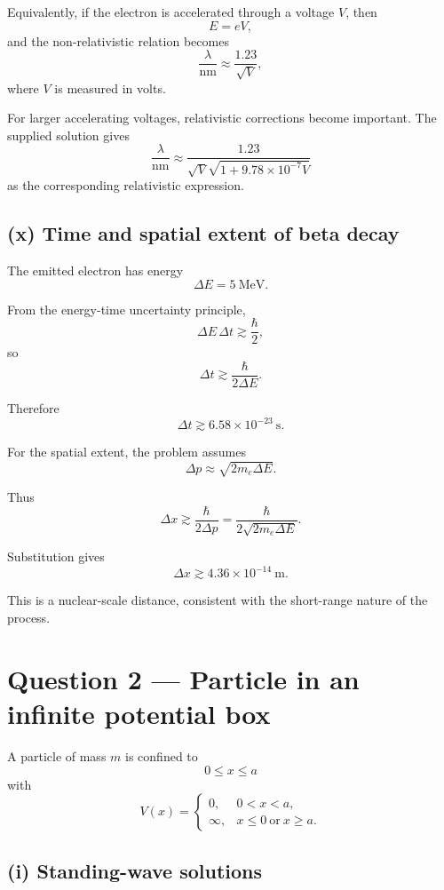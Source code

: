 \documentclass[11pt,a4paper]{article}
\begin{document}
Equivalently, if the electron is accelerated through a voltage $V$, then
\[
E=eV,
\]
and the non-relativistic relation becomes
\[
\boxed{
\frac{\lambda}{\mathrm{nm}}
\approx
\frac{1.23}{\sqrt{V}}
},
\]
where $V$ is measured in volts.

For larger accelerating voltages, relativistic corrections become important. The
supplied solution gives
\[
\boxed{
\frac{\lambda}{\mathrm{nm}}
\approx
\frac{1.23}
{\sqrt{V}\sqrt{1+9.78\times10^{-7}V}}
}
\]
as the corresponding relativistic expression.

\subsection{(x) Time and spatial extent of beta decay}

The emitted electron has energy
\[
\Delta E=5\ \mathrm{MeV}.
\]

From the energy-time uncertainty principle,
\[
\Delta E\,\Delta t\gtrsim\frac{\hbar}{2},
\]
so
\[
\Delta t
\gtrsim
\frac{\hbar}{2\Delta E}.
\]

Therefore
\[
\boxed{\Delta t\gtrsim6.58\times10^{-23}\ \mathrm s}.
\]

For the spatial extent, the problem assumes
\[
\Delta p\approx\sqrt{2m_e\Delta E}.
\]

Thus
\[
\Delta x
\gtrsim
\frac{\hbar}{2\Delta p}
=
\frac{\hbar}
{2\sqrt{2m_e\Delta E}}.
\]

Substitution gives
\[
\boxed{\Delta x\gtrsim4.36\times10^{-14}\ \mathrm m}.
\]

This is a nuclear-scale distance, consistent with the short-range nature of the
process.

\section{Question 2 --- Particle in an infinite potential box}

A particle of mass $m$ is confined to
\[
0\le x\le a
\]
with
\[
V(x)=
\begin{cases}
0, & 0<x<a,\\
\infty, & x\le0\ \text{or}\ x\ge a.
\end{cases}
\]

\subsection{(i) Standing-wave solutions}
\end{document}
